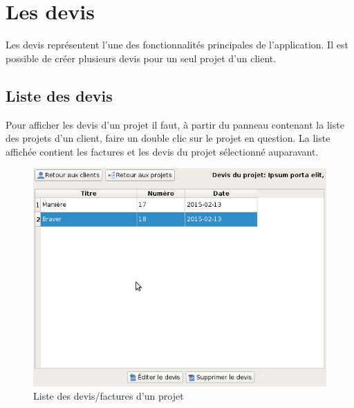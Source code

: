 \chapter{Les devis}
Les devis représentent l'une des fonctionnalités principales de l'application. Il est possible de créer plusieurs devis pour un seul projet d'un client. 
\section{Liste des devis}
Pour afficher les devis d'un projet il faut, à partir du panneau contenant la liste des projets d'un client, faire un double clic sur le projet en question. La liste affichée contient les factures et les devis du projet sélectionné auparavant.
\begin{figure}[H]
	\centering
	\includegraphics[width=12cm]{screens/ihmDevis.png}
	\caption{Liste des devis/factures d'un projet}
\end{figure}

